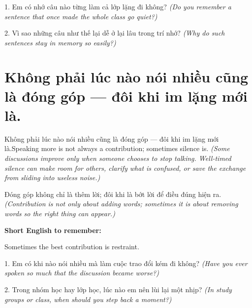 \begin{tuhocnhanh}
1. Em có nhớ câu nào từng làm cả lớp lặng đi không? \textit{(Do you remember a sentence that once made the whole class go quiet?)}

2. Vì sao những câu như thế lại dễ ở lại lâu trong trí nhớ? \textit{(Why do such sentences stay in memory so easily?)}
\end{tuhocnhanh}
\ngancach


\section{Không phải lúc nào nói nhiều cũng là đóng góp — đôi khi im lặng mới là.}
\begin{truyen}{Không phải lúc nào nói nhiều cũng là đóng góp — đôi khi im lặng mới là.}{Speaking more is not always a contribution; sometimes silence is.}
\textit{(Some discussions improve only when someone chooses to stop talking. Well-timed silence can make room for others, clarify what is confused, or save the exchange from sliding into useless noise.)}
\end{truyen}

\begin{baihoc}
Đóng góp không chỉ là thêm lời; đôi khi là bớt lời để điều đúng hiện ra.
\textit{(Contribution is not only about adding words; sometimes it is about removing words so the right thing can appear.)}
\end{baihoc}

\begin{ghinhoanh}
\textbf{Short English to remember:}

Sometimes the best contribution is restraint.

\end{ghinhoanh}

\begin{tuhocnhanh}
1. Em có khi nào nói nhiều mà làm cuộc trao đổi kém đi không? \textit{(Have you ever spoken so much that the discussion became worse?)}

2. Trong nhóm học hay lớp học, lúc nào em nên lùi lại một nhịp? \textit{(In study groups or class, when should you step back a moment?)}
\end{tuhocnhanh}
\ngancach


